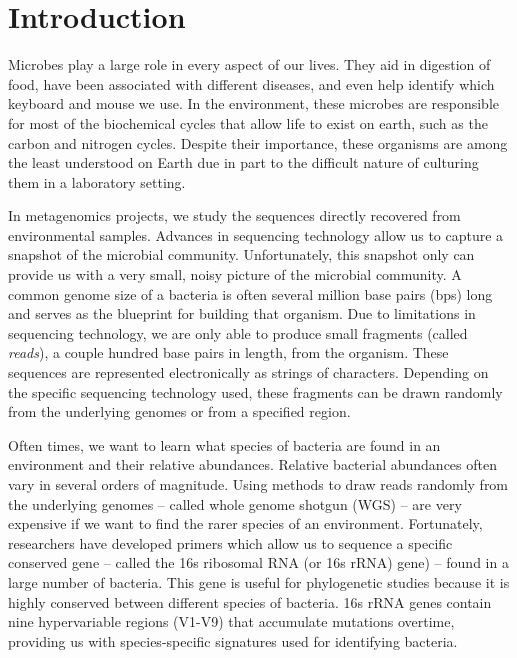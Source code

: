 \section{Introduction}

Microbes play a large role in every aspect of our lives.
They aid in digestion of food\cite{gill_metagenomic_2006}, have been associated with different diseases\cite{qin_metagenome-wide_2012}, and even help identify which keyboard and mouse we use\cite{fierer_forensic_2010}.
In the environment, these microbes are responsible for most of the biochemical cycles that allow life to exist on earth, such as the carbon and nitrogen cycles\cite{venter_environmental_2004}.
Despite their importance, these organisms are among the least understood on Earth due in part to the difficult nature of culturing them in a laboratory setting.

In metagenomics projects, we study the sequences directly recovered from environmental samples\cite{wooley_primer_2010}.
Advances in sequencing technology allow us to capture a snapshot of the microbial community.
Unfortunately, this snapshot only can provide us with a very small, noisy picture of the microbial community.
A common genome size of a bacteria is often several million base pairs (bps) long and serves as the blueprint for building that organism.
Due to limitations in sequencing technology, we are only able to produce small fragments (called \emph{reads}), a couple hundred base pairs in length, from the organism.
These sequences are represented electronically as strings of characters.
Depending on the specific sequencing technology used, these fragments can be drawn randomly from the underlying genomes or from a specified region.

Often times, we want to learn what species of bacteria are found in an environment and their relative abundances.
Relative bacterial abundances often vary in several orders of magnitude.
Using methods to draw reads randomly from the underlying genomes -- called whole genome shotgun (WGS) -- are very expensive if we want to find the rarer species of an environment.
Fortunately, researchers have developed primers which allow us to sequence a specific conserved gene -- called the 16s ribosomal RNA (or 16s rRNA) gene) -- found in a large number of bacteria.
This gene is useful for phylogenetic studies because it is highly conserved between different species of bacteria.
16s rRNA genes contain nine hypervariable regions (V1-V9) that accumulate mutations overtime, providing us with species-specific signatures used for identifying bacteria.

